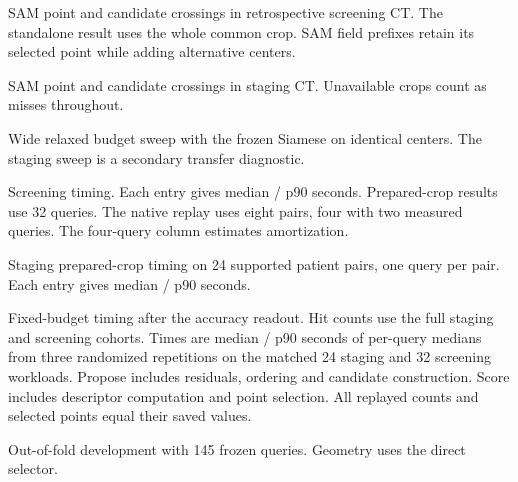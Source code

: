 \begin{table}[!t]
\centering\small
\setlength{\tabcolsep}{3pt}
\caption{SAM point and candidate crossings in retrospective screening CT. The standalone result uses the whole common crop. SAM field prefixes retain its selected point while adding alternative centers.}

\end{table}

\begin{table}[!t]
\centering\small
\setlength{\tabcolsep}{3pt}
\caption{SAM point and candidate crossings in staging CT. Unavailable crops count as misses throughout.}

\end{table}

\begin{table}[!t]
\centering\small
\caption{Wide relaxed budget sweep with the frozen Siamese on identical centers. The staging sweep is a secondary transfer diagnostic.}

\end{table}

\begin{table}[!t]
\centering\small
\setlength{\tabcolsep}{4pt}
\caption{Screening timing. Each entry gives median / p90 seconds. Prepared-crop results use 32 queries. The native replay uses eight pairs, four with two measured queries. The four-query column estimates amortization.}
\label{tab:timing-v6}

\end{table}

\begin{table}[!t]
\centering\small
\caption{Staging prepared-crop timing on 24 supported patient pairs, one query per pair. Each entry gives median / p90 seconds.}

\end{table}

\begin{table}[!t]
\centering\small
\setlength{\tabcolsep}{4pt}
\caption{Fixed-budget timing after the accuracy readout. Hit counts use the full staging and screening cohorts. Times are median / p90 seconds of per-query medians from three randomized repetitions on the matched 24 staging and 32 screening workloads. Propose includes residuals, ordering and candidate construction. Score includes descriptor computation and point selection. All replayed counts and selected points equal their saved values.}
\label{tab:fixed-budget-timing}

\end{table}


\begin{table}[!t]
\centering\small
\caption{Out-of-fold development with 145 frozen queries. Geometry uses the direct selector.}
\label{tab:devsearch}

\end{table}

